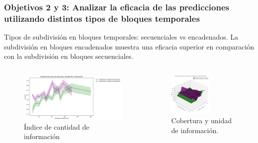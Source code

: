 \documentclass{beamer}
\begin{document}
\begin{frame}
	\frametitle{Objetivos 2 y 3: Analizar la eficacia de las predicciones utilizando distintos tipos de bloques temporales}
\begin{block}{Tipos de subdivisión en bloques temporales: secuenciales vs encadenados.}
La subdivisión en bloques encadenados muestra una eficacia superior en comparación con la subdivisión en bloques secuenciales.
	\end{block}
	

	\begin{columns}[c]
	\begin{column}{.5\textwidth}
		\begin{figure}
			\centering
			\includegraphics[width=1\textwidth]{figs/cap7/figura_17}
\caption{Índice de cantidad de información}
		\end{figure}      
	\end{column}
	\begin{column}{.5\textwidth}
		\begin{figure}
			\centering
			\includegraphics[width=0.6\textwidth]{figs/cap7/figura_18}
			\caption{Cobertura y unidad de información.}
		\end{figure}
	\end{column}
\end{columns}
	
\end{frame}
\end{document}
